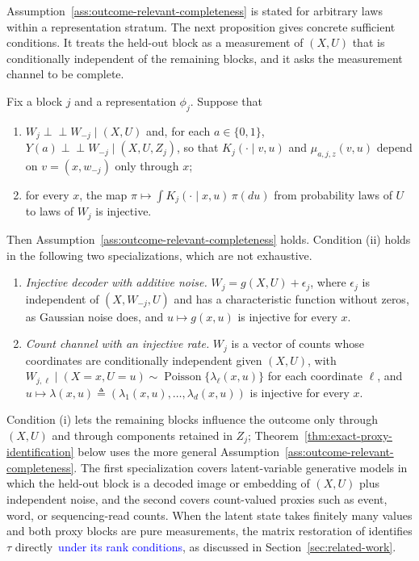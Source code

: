 Assumption~\ref{ass:outcome-relevant-completeness} is stated for arbitrary laws within a representation stratum. The next proposition gives concrete sufficient conditions. It treats the held-out block as a measurement of $(X,U)$ that is conditionally independent of the remaining blocks, and it asks the measurement channel to be complete.

\begin{proposition}
\label{prop:orc-sufficient}
\normalfont

Fix a block $j$ and a representation $\phi_j$. Suppose that
\begin{enumerate}[label=(\roman*),leftmargin=*]
\item $W_j\perp\!\!\!\perp W_{-j}\mid(X,U)$ and, for each $a\in\{0,1\}$, $Y(a)\perp\!\!\!\perp W_{-j}\mid(X,U,Z_j)$, so that $K_j(\cdot\mid v,u)$ and $\mu_{a,j,z}(v,u)$ depend on $v=(x,w_{-j})$ only through $x$;
\item for every $x$, the map $\pi\mapsto\int K_j(\cdot\mid x,u)\,\pi(du)$ from probability laws of $U$ to laws of $W_j$ is injective.
\end{enumerate}
Then Assumption~\ref{ass:outcome-relevant-completeness} holds. Condition (ii) holds in the following two specializations, which are not exhaustive.
\begin{enumerate}[label=(\alph*),leftmargin=*]
\item \textit{Injective decoder with additive noise.} $W_j=g(X,U)+\epsilon_j$, where $\epsilon_j$ is independent of $(X,W_{-j},U)$ and has a characteristic function without zeros, as Gaussian noise does, and $u\mapsto g(x,u)$ is injective for every $x$.
\item \textit{Count channel with an injective rate.} $W_j$ is a vector of counts whose coordinates are conditionally independent given $(X,U)$, with $W_{j,\ell}\mid(X=x,U=u)\sim\operatorname{Poisson}\{\lambda_\ell(x,u)\}$ for each coordinate $\ell$, and $u\mapsto\lambda(x,u)\triangleq(\lambda_1(x,u),\ldots,\lambda_{d}(x,u))$ is injective for every $x$.
\end{enumerate}

\end{proposition}

Condition (i) lets the remaining blocks influence the outcome only through $(X,U)$ and through components retained in $Z_j$; Theorem~\ref{thm:exact-proxy-identification} below uses the more general Assumption~\ref{ass:outcome-relevant-completeness}. The first specialization covers latent-variable generative models in which the held-out block is a decoded image or embedding of $(X,U)$ plus independent noise, and the second covers count-valued proxies such as event, word, or sequencing-read counts. When the latent state takes finitely many values and both proxy blocks are pure measurements, the matrix restoration of \citet{kuroki2014measurement} identifies $\tau$ directly\textcolor{blue}{\ under its rank conditions}, as discussed in Section~\ref{sec:related-work}.

